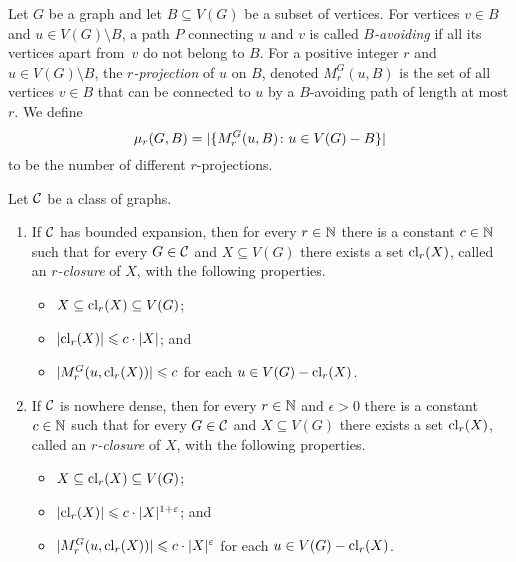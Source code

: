 Let $G$ be a graph and let $B\subseteq V(G)$ be a subset of vertices. For vertices $v\in B$ and $u\in V(G)\setminus B$, a path $P$ connecting $u$ and $v$ is called {\em{$B$-avoiding}}
if all its vertices apart from~$v$ do not belong to $B$. For a positive integer $r$ and $u\in V(G)\setminus B$, the {\em{$r$-projection}} of $u$ on $B$, denoted $M^G_r(u,B)$ is the set of all vertices $v\in B$ that
can be connected to $u$ by a $B$-avoiding path of length at most $r$. 
%
%
We define 
\[\mu_r(G,B)=|\{M_r^G(u,B)\colon u\in V(G)- B\}|\]
to be the number of different $r$-projections.

\begin{lemma}\label{lem:closure}
Let $\mathcal{C}$ be a class of graphs. 
\begin{enumerate}
\item If $\mathcal{C}$ has bounded expansion, then for every $r\in \mathbb{N}$ there is a constant $c\in \mathbb{N}$ such that for
every $G\in \mathcal{C}$ and $X\subseteq V(G)$ there exists a set $\mathrm{cl}_r(X)$, called an {\em{$r$-closure}} of $X$, with the following properties. 
\begin{itemize}
  \item $X\subseteq \mathrm{cl}_r(X)\subseteq V(G)$;
  \item $|\mathrm{cl}_r(X)|\leqslant c\cdot |X|$; and
  \item $|M_r^G(u,\mathrm{cl}_r(X))|\leqslant c$ for each $u\in V(G)- \mathrm{cl}_r(X)$.
\end{itemize}
\item If $\mathcal{C}$ is nowhere dense, then for every $r\in\mathbb{N}$ and $\epsilon>0$ there is a 
constant $c\in\mathbb{N}$ such that for every $G\in \mathcal{C}$ and $X\subseteq V(G)$ there exists a set 
$\mathrm{cl}_r(X)$,  called an {\em{$r$-closure}} of $X$, 
with the following properties. 
\begin{itemize}
  \item $X\subseteq \mathrm{cl}_r(X)\subseteq V(G)$;
  \item $|\mathrm{cl}_r(X)|\leqslant c\cdot |X|^{1+\varepsilon}$; and
  \item $|M_r^G(u,\mathrm{cl}_r(X))|\leqslant c\cdot |X|^{\varepsilon}$ for each $u\in V(G)- \mathrm{cl}_r(X)$.
\end{itemize}
\end{enumerate}
\end{lemma}


